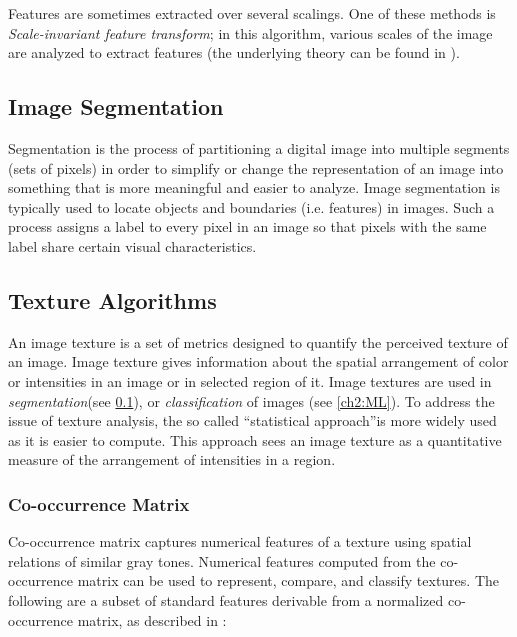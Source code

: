 Features are sometimes extracted over several scalings. One of these methods is \textit{Scale-invariant feature transform};
in this algorithm, various scales of the image are analyzed to extract features\cite{LoweScale} (the underlying theory can be found in \cite{feature01ScaleSpace}).\\


\subsection{Image Segmentation}
\label{ch2:IS}
Segmentation is the process of partitioning a digital image into multiple segments (sets of pixels) in order to simplify
or change the representation of an image into something that is more meaningful and easier to analyze\cite{breastCancer02}.
Image segmentation is typically used to locate objects and boundaries (i.e. features) in images. 
Such a process assigns a label to every pixel in an image so that pixels with the same label share certain visual characteristics\cite{mitosisDetectionLearningBased}.


\subsection{Texture Algorithms}
\label{ch2:texture}

An image texture is a set of metrics designed to quantify the perceived texture of an image.
Image texture gives information about the spatial arrangement of color or intensities in an image or in selected region of it\cite{ CV_Forsyth}.
Image textures are used in \textit{segmentation}(see \ref{ch2:IS}), or \textit{classification} of images (see \ref{ch2:ML}).
To address the issue of texture analysis, the so called \textquotedblleft{}statistical approach\textquotedblright  is more widely used as it is easier to compute.
This approach sees an image texture as a quantitative measure of the arrangement of intensities in a region.

\subsubsection{Co-occurrence Matrix}

Co-occurrence matrix captures numerical features of a texture using spatial relations of similar gray tones.
Numerical features computed from the co-occurrence matrix can be used to represent, compare, and classify textures\cite{textureGLCMexample, textureGLCM_wood}.
The following are a subset of standard features derivable from a normalized co-occurrence matrix, as described in \cite{haralick1973textural}:

